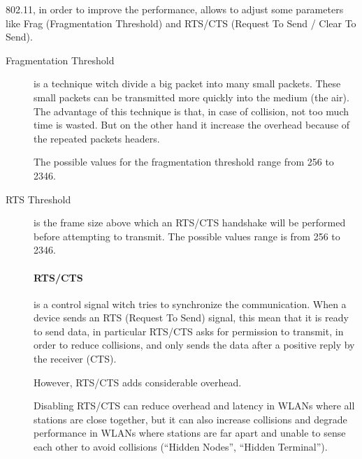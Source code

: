 	802.11, in order to improve the performance, allows to adjust some parameters like Frag (Fragmentation Threshold) and RTS/CTS (Request To Send / Clear To Send).
	
	\begin{description}
		\item[Fragmentation Threshold] is a technique witch divide a big packet into many small packets. These small packets can be transmitted more quickly into the medium (the air).
			The advantage of this technique is that, in case of collision, not too much time is wasted.  But on the other hand it increase the overhead because of the repeated packets headers.
			
			The possible values for the fragmentation threshold range from 256 to 2346.
	
		\item[RTS Threshold] is the frame size above which an RTS/CTS handshake will be performed before attempting to transmit. The possible values range is from 256 to 2346.
	
			\paragraph{RTS/CTS} is a control signal witch tries to synchronize the communication.
			When a device sends an RTS (Request To Send) signal, this mean that it is ready to send data, in particular RTS/CTS asks for permission to transmit, in order to reduce collisions, and only sends the data after a positive reply by the receiver (CTS).

			However, RTS/CTS adds considerable overhead.

			Disabling RTS/CTS can reduce overhead and latency in WLANs where all stations are close together, but it can also increase collisions and degrade performance in WLANs where stations are far apart and unable to sense each other to avoid collisions (``Hidden Nodes'', ``Hidden Terminal'').
	\end{description}


	








